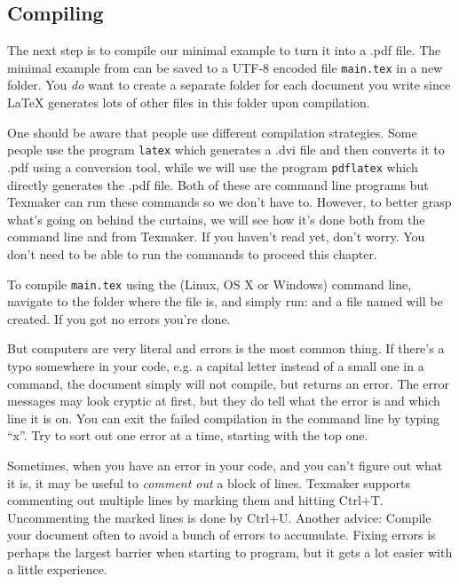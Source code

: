 \subsection{Compiling}
The next step is to compile our minimal example to turn it into a .pdf file. The minimal example from  can be saved to a UTF-8 encoded file \texttt{main.tex} in a new folder. You \emph{do} want to create a separate folder for each document you write since \LaTeX{} generates lots of other files in this folder upon compilation.

One should be aware that people use different compilation strategies. Some people use the program \texttt{latex} which generates a .dvi file and then converts it to .pdf using a conversion tool, while we will use the program \texttt{pdflatex} which directly generates the .pdf file. Both of these are command line programs but Texmaker can run these commands so we don't have to. However, to better grasp what's going on behind the curtains, we will see how it's done both from the command line and from Texmaker. If you haven't read  yet, don't worry. You don't need to be able to run the commands to proceed this chapter.

To compile \texttt{main.tex} using the (Linux, OS X or Windows) command line, navigate to the folder where the file is, and simply run:
and a file named  will be created. If you got no errors you're done.

But computers are very literal and errors is the most common thing. If there's a typo somewhere in your code, e.g. a capital letter instead of a small one in a command, the document simply will not compile, but returns an error. The error messages may look cryptic at first, but they do tell what the error is and which line it is on. You can exit the failed compilation in the command line by typing ``x''. Try to sort out one error at a time, starting with the top one.

Sometimes, when you have an error in your code, and you can't figure out what it is, it may be useful to \emph{comment out} a block of lines. Texmaker supports commenting out multiple lines by marking them and hitting Ctrl+T. Uncommenting the marked lines is done by Ctrl+U. Another advice: Compile your document often to avoid a bunch of errors to accumulate. Fixing errors is perhaps the largest barrier when starting to program, but it gets a lot easier with a little experience.

